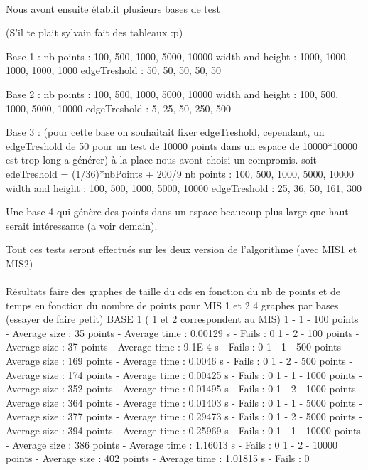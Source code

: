 \paragraph{}
Nous avont ensuite établit plusieurs bases de test

(S'il te plait sylvain fait des tableaux :p)

Base 1 :
nb points : 100, 500, 1000, 5000, 10000
width and height : 1000, 1000, 1000, 1000, 1000
edgeTreshold : 50, 50, 50, 50, 50

Base 2 :
nb points : 100, 500, 1000, 5000, 10000
width and height : 100, 500, 1000, 5000, 10000
edgeTreshold : 5, 25, 50, 250, 500

Base 3 : (pour cette base on souhaitait fixer edgeTreshold, cependant, un edgeTreshold de 50 pour un test de 10000 points dans un espace de 10000*10000 est trop long a générer) à la place nous avont choisi un compromis.
soit edeTreshold = (1/36)*nbPoints + 200/9
nb points : 100, 500, 1000, 5000, 10000
width and height : 100, 500, 1000, 5000, 10000
edgeTreshold : 25, 36, 50, 161, 300

Une base 4 qui génère des points dans un espace beaucoup plus large que haut serait intéressante (a voir demain).

Tout ces tests seront effectués sur les deux version de l'algorithme (avec MIS1 et MIS2)

\paragraph{}

Résultats faire des graphes de taille du cds en fonction du nb de points et de temps en fonction du nombre de points pour MIS 1 et 2
4 graphes par bases (essayer de faire petit)
BASE 1 ( 1 et 2 correspondent au MIS)
1 - 1 - 100 points - Average size : 35 points - Average time : 0.00129 s - Fails : 0
1 - 2 - 100 points - Average size : 37 points - Average time : 9.1E-4 s - Fails : 0
1 - 1 - 500 points - Average size : 169 points - Average time : 0.0046 s - Fails : 0
1 - 2 - 500 points - Average size : 174 points - Average time : 0.00425 s - Fails : 0
1 - 1 - 1000 points - Average size : 352 points - Average time : 0.01495 s - Fails : 0
1 - 2 - 1000 points - Average size : 364 points - Average time : 0.01403 s - Fails : 0
1 - 1 - 5000 points - Average size : 377 points - Average time : 0.29473 s - Fails : 0
1 - 2 - 5000 points - Average size : 394 points - Average time : 0.25969 s - Fails : 0
1 - 1 - 10000 points - Average size : 386 points - Average time : 1.16013 s - Fails : 0
1 - 2 - 10000 points - Average size : 402 points - Average time : 1.01815 s - Fails : 0


